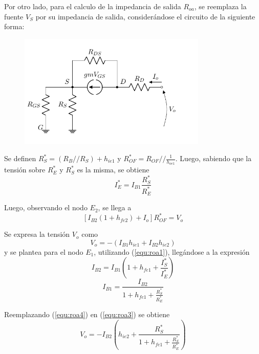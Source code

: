 Por otro lado, para el calculo de la impedancia de salida $R_{oa}$, se reemplaza la fuente $V_S$ por su impedancia de salida, considerándose el circuito de la siguiente forma:
\begin{figure}[H]
\centering
	\includegraphics[width=0.8\textwidth, page=7]{Imagenes/ModeloIncremental.pdf}
\end{figure}
Se definen $R_{S}^* = \left( R_B // R_S \right) + h_{ie1}$ y $R_{OF}^* = R_{OF} // \frac{1}{h_{oe1}}$. Luego, sabiendo que la tensión sobre $R_{E}^*$ y $R_{S}^*$ es la misma, se obtiene
\begin{equation}
	I_{E}^{*} = I_{B1} \frac{R_{S}^*}{R_{E}^*}
	\label{equ:roa1}
\end{equation}

Luego, observando el nodo $E_2$, se llega a
\begin{equation}
	\left[ I_{B2} \left( 1 + h_{fe2} \right) + I_o \right] R_{OF}^* = V_o
	\label{equ:roa2}
\end{equation}

Se expresa la tensión $V_o$ como
\begin{equation}
	V_o = - \left( I_{B1} h_{ie1} + I_{B2} h_{ie2} \right)
	\label{equ:roa3}
\end{equation}
y se plantea para el nodo $E_1$, utilizando (\ref{equ:roa1}), llegándose a la expresión
\begin{equation*}
	I_{B2} = I_{B1} \left( 1 +h_{fe1} + \frac{I_{S}^{*}}{I_{E}^{*}} \right)
\end{equation*}
\begin{equation}
	I_{B1} = \frac{I_{B2}}{1 +h_{fe1} + \frac{R_{S}^{*}}{R_{E}^{*}}}
	\label{equ:roa4}
\end{equation}

Reemplazando (\ref{equ:roa4}) en (\ref{equ:roa3}) se obtiene
\begin{equation}
	V_o = - I_{B2} \left( h_{ie2} + \frac{R_{S}^{*}}{ 1 +h_{fe1} + \frac{R_{S}^{*}}{R_{E}^{*}}} \right)
	\label{equ:roa5}
\end{equation}

